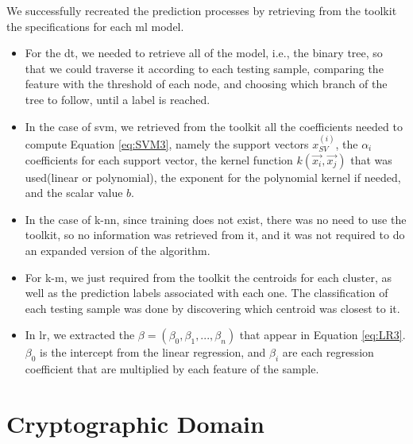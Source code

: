 We successfully recreated the prediction processes by retrieving from the toolkit the specifications for each \ac{ml} model.

\begin{itemize}
	
    \item For the \ac{dt}, we needed to retrieve all of the model, i.e., the binary tree, so that we could traverse it according to each testing sample, comparing the feature with the threshold of each node, and choosing which branch of the tree to follow, until a label is reached. 

    \item In the case of \ac{svm}, we retrieved from the toolkit all the coefficients needed to compute Equation \ref{eq:SVM3}, namely the support vectors $x_{SV}^{(i)}$, the $\alpha_i$ coefficients for each support vector, the kernel function $k({\vec {x_{i}}},{\vec {x_{j}}})$ that was used(linear or polynomial), the exponent for the polynomial kernel if needed, and the scalar value $b$.

    \item In the case of \ac{k-nn}, since training does not exist, there was no need to use the toolkit, so no information was retrieved from it, and it was not required to do an expanded version of the algorithm.

    \item For \ac{k-m}, we just required from the toolkit the centroids for each cluster, as well as the prediction labels associated with each one. The classification of each testing sample was done by discovering which centroid was closest to it.

    \item In \ac{lr}, we extracted the $\beta=(\beta_0,\beta_1,...,\beta_n)$ that appear in Equation \ref{eq:LR3}. $\beta_0$ is the intercept from the linear regression, and $\beta_i$ are each regression coefficient that are multiplied by each feature of the sample.

\end{itemize}





\section{Cryptographic Domain}
\label{sec:CryptoDomainImplementation}


